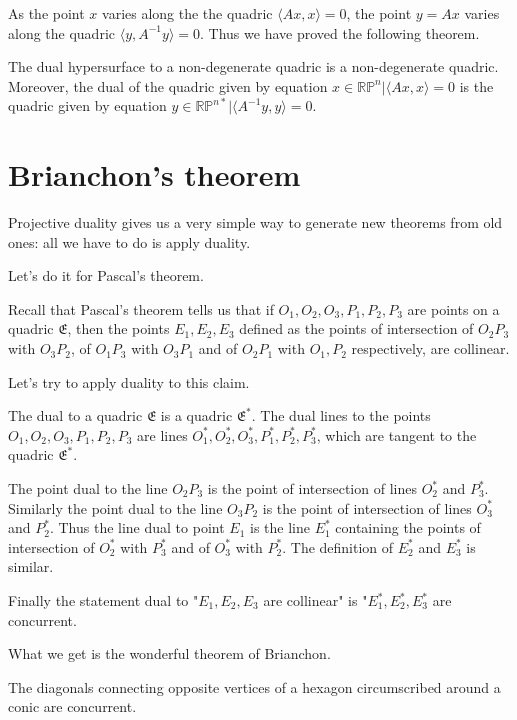 As the point $x$ varies along the the quadric $\langle Ax,x \rangle =0$, the point $y=Ax$ varies along the quadric $\langle y, A^{-1} y \rangle=0$. Thus we have proved the following theorem.

\begin{theorem}
The dual hypersurface to a non-degenerate quadric is a non-degenerate quadric. Moreover, the dual of the quadric given by equation $x\in \mathbb{RP}^n|\langle Ax, x \rangle =0$ is the quadric given by equation $y\in \mathbb{RP}^{n*}|\langle A^{-1}y,y\rangle=0$.
\end{theorem}

\section{Brianchon's theorem}

Projective duality gives us a very simple way to generate new theorems from old ones: all we have to do is apply duality.

Let's do it for Pascal's theorem.

Recall that Pascal's theorem tells us that if $O_1,O_2,O_3,P_1,P_2,P_3$ are points on a quadric $\mathfrak{E}$, then the points $E_1,E_2,E_3$ defined as the points of intersection of $O_2P_3$ with $O_3P_2$, of $O_1P_3$ with $O_3P_1$ and of $O_2P_1$ with $O_1,P_2$ respectively, are collinear.

Let's try to apply duality to this claim.

The dual to a quadric $\mathfrak{E}$ is a quadric $\mathfrak{E}^*$. The dual lines to the points $O_1,O_2,O_3,P_1,P_2,P_3$ are lines $O_1^*,O_2^*,O_3^*,P_1^*,P_2^*,P_3^*$, which are tangent to the quadric $\mathfrak{E}^*$.

The point dual to the line $O_2P_3$ is the point of intersection of lines $O_2^*$ and $P_3^*$. Similarly the point dual to the line $O_3P_2$ is the point of intersection of lines $O_3^*$ and $P_2^*$. Thus the line dual to point $E_1$ is the line $E_1^*$ containing the points of intersection of $O_2^*$ with $P_3^*$ and of $O_3^*$ with $P_2^*$. The definition of $E_2^*$ and $E_3^*$ is similar.

Finally the statement dual to "$E_1,E_2,E_3$ are collinear" is "$E_1^*,E_2^*,E_3^*$ are concurrent.

What we get is the wonderful theorem of Brianchon.

\begin{theorem}

The diagonals connecting opposite vertices of a hexagon circumscribed around a conic are concurrent.

\end{theorem}

